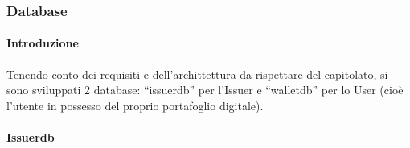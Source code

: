 \subsubsection{Database}\label{Database}

\paragraph{Introduzione}
Tenendo conto dei requisiti e dell’archittettura da rispettare del capitolato, si sono sviluppati 2 database: “issuerdb” per l’Issuer e “walletdb”  per lo User (cioè l’utente in possesso del proprio portafoglio digitale).

\paragraph{Issuerdb}
    
